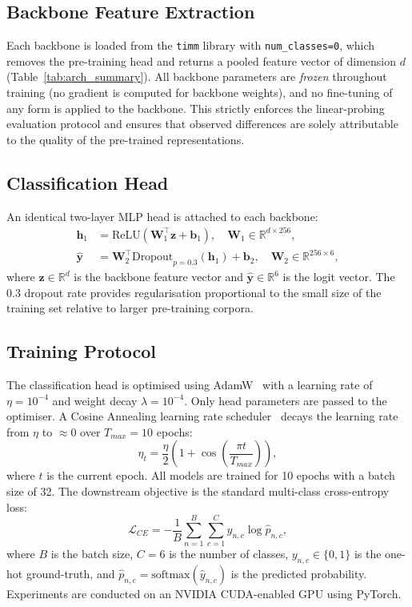 \documentclass[journal]{IEEEtran}
\begin{document}
\subsection{Backbone Feature Extraction}
Each backbone is loaded from the \texttt{timm} library with \texttt{num\_classes=0},
which removes the pre-training head and returns a pooled feature vector of dimension $d$
(Table~\ref{tab:arch_summary}). All backbone parameters are \emph{frozen} throughout
training (no gradient is computed for backbone weights), and no fine-tuning of any form
is applied to the backbone. This strictly enforces the linear-probing evaluation protocol
and ensures that observed differences are solely attributable to the quality of the
pre-trained representations.

\subsection{Classification Head}
An identical two-layer MLP head is attached to each backbone:
\begin{align}
    \mathbf{h}_1 &= \text{ReLU}(\mathbf{W}_1^\top \mathbf{z} + \mathbf{b}_1),
    \quad \mathbf{W}_1 \in \mathbb{R}^{d \times 256}, \\
    \hat{\mathbf{y}} &= \mathbf{W}_2^\top \text{Dropout}_{p=0.3}(\mathbf{h}_1) + \mathbf{b}_2,
    \quad \mathbf{W}_2 \in \mathbb{R}^{256 \times 6},
\end{align}
where $\mathbf{z} \in \mathbb{R}^d$ is the backbone feature vector and $\hat{\mathbf{y}}
\in \mathbb{R}^6$ is the logit vector. The 0.3 dropout rate provides regularisation
proportional to the small size of the training set relative to larger pre-training corpora.

\subsection{Training Protocol}
The classification head is optimised using AdamW~\cite{loshchilov2019adamw} with a
learning rate of $\eta = 10^{-4}$ and weight decay $\lambda = 10^{-4}$. Only head
parameters are passed to the optimiser. A Cosine Annealing learning rate
scheduler~\cite{loshchilov2017cosine} decays the learning rate from $\eta$ to
$\approx 0$ over $T_{max} = 10$ epochs:
\begin{equation}
    \eta_t = \frac{\eta}{2}\left(1 + \cos\!\left(\frac{\pi t}{T_{max}}\right)\right),
    \label{eq:cosine_lr}
\end{equation}
where $t$ is the current epoch. All models are trained for 10 epochs with a
batch size of 32. The downstream objective is the standard multi-class cross-entropy loss:
\begin{equation}
    \mathcal{L}_{CE} = -\frac{1}{B}\sum_{n=1}^{B}\sum_{c=1}^{C}
    y_{n,c} \log \hat{p}_{n,c},
    \label{eq:ce_loss}
\end{equation}
where $B$ is the batch size, $C=6$ is the number of classes,
$y_{n,c} \in \{0, 1\}$ is the one-hot ground-truth, and
$\hat{p}_{n,c} = \text{softmax}(\hat{y}_{n,c})$ is the predicted probability.
Experiments are conducted on an NVIDIA CUDA-enabled GPU using PyTorch.
\end{document}

